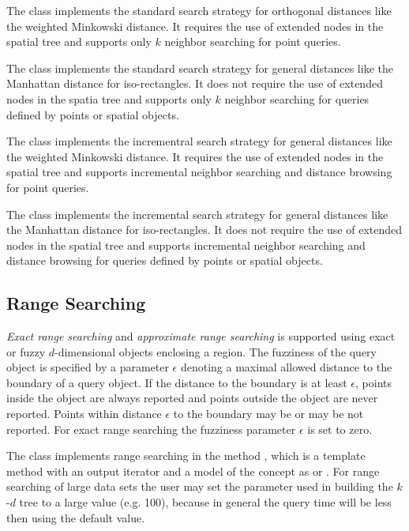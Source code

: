 The class  implements the standard
search strategy for orthogonal distances like the weighted Minkowski
distance. It requires the use of extended nodes in the spatial tree
and supports only $k$ neighbor searching for point queries.

The class  implements the standard search strategy for
general distances like the Manhattan distance for iso-rectangles.
It does not require the use of extended nodes in the spatia tree and supports
only $k$ neighbor searching for queries defined by points or spatial
objects.

The class  implements the incrementral
search strategy for general distances like the weighted Minkowski
distance. It requires the use of extended nodes in the spatial tree
and supports incremental neighbor searching and distance browsing for
point queries.

The class  implements the incremental
search strategy for general distances like the Manhattan distance for
iso-rectangles.  It does not require the use of extended nodes in the
spatial tree and supports incremental neighbor searching and distance
browsing for queries defined by points or spatial objects.




\subsection{Range Searching}

{\em Exact range searching} and {\em approximate range searching} is
supported using exact or fuzzy $d$-dimensional objects enclosing a
region.  The fuzziness of the query object is specified by a parameter
$\epsilon$ denoting a maximal allowed distance to the boundary of a
query object.  If the distance to the boundary is at least
$\epsilon$, points inside the object are always reported and points
outside the object are never reported. Points within distance
$\epsilon$ to the boundary may be or may be not reported.  For exact
range searching the fuzziness parameter $\epsilon$ is set to zero.

The class  implements range searching in the method ,
which is a template method with an output iterator and a model of the
concept  as   
or . 
For range searching of large data sets the user may set the parameter  
used in building the $k$-$d$ tree to a large value (e.g. 100), 
because in general the query time will be less then using the default value.

